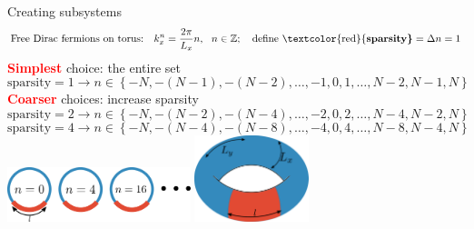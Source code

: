 \documentclass[11pt,aspectratio=169]{beamer}
\newcommand{\focus}[1]{\textcolor{red}{\bf{#1}}}
\begin{document}
\begin{frame}{Creating subsystems}
	\[\text{Free Dirac fermions on torus:}~ ~ ~ k_x^n = \frac{2\pi }{L_x} n,~ ~ n \in \mathbb{Z};~~~ \text{define \focus{sparsity}} = \Delta n = 1\]
	\focus{Simplest} choice: the entire set
	\[\text{sparsity} = 1 \longrightarrow n \in \left\{-N,-(N-1),-(N-2),\ldots,-1,0,1,\ldots,N-2,N-1,N\right\} \]
	\focus{Coarser} choices: increase sparsity
	\[\text{sparsity} = 2 \longrightarrow n \in \left\{-N,-(N-2),-(N-4),\ldots,-2,0,2,\ldots,N-4,N-2,N\right\} \]
	\[\text{sparsity} = 4 \longrightarrow n \in \left\{-N,-(N-4),-(N-8),\ldots,-4,0,4,\ldots,N-8,N-4,N\right\} \]
	\centering
	\vspace*{\fill}
	\includegraphics[width=0.4\textwidth]{figures/A_mi.pdf}
	\hspace*{\fill}
	\includegraphics[width=0.25\textwidth]{figures/subsystem-torus.pdf}
\end{frame}
\end{document}
